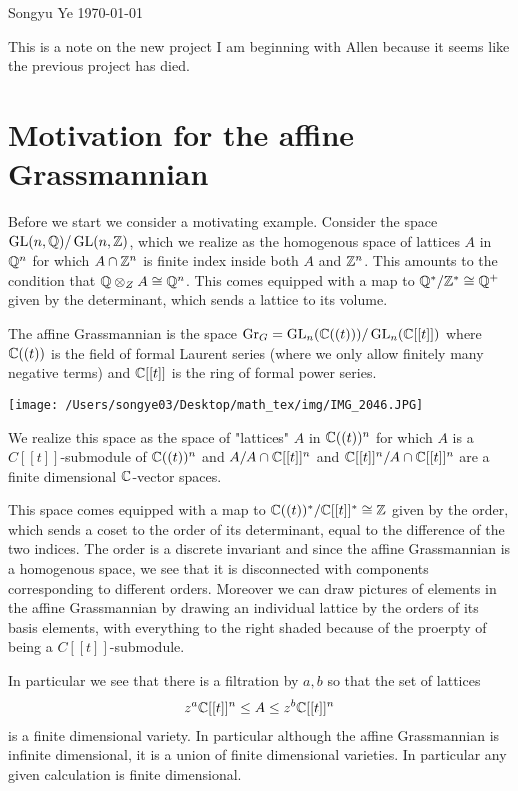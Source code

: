 \documentclass[12pt]{article}
\begin{document}
Songyu Ye
\today

\hfill

This is a note on the new project I am beginning with Allen because it seems like the previous project
has died.

\section{Motivation for the affine Grassmannian}
Before we start we consider a motivating example. Consider the space 
$\operatorname{GL}(n,\mathbb{Q})/\operatorname{GL}(n,\mathbb{Z})$, which we realize as the homogenous space of lattices $A$ in $\mathbb{Q}^n$ for which $A\cap \mathbb{Z}^n$
is finite index inside both $A$ and $\mathbb{Z}^n$. This amounts to the condition that $\mathbb{Q} \otimes_Z A \cong \mathbb{Q}^n$.
This comes equipped with a map to $\mathbb{Q}^*/\mathbb{Z}^* \cong \mathbb{Q}^+$ given by the determinant, which sends a lattice to
its volume.

\begin{definition}
    The affine Grassmannian is the space $\operatorname{Gr}_G = \operatorname{GL}_n(\mathbb{C}((t)))/\operatorname{GL}_n(\mathbb{C}[[t]])$ where
    $\mathbb{C}((t))$ is the field of formal Laurent series (where we only allow
    finitely many negative terms) and $\mathbb{C}[[t]]$ is the ring of formal power series.
\end{definition}

\begin{center}
    \texttt{[image: /Users/songye03/Desktop/math\_tex/img/IMG\_2046.JPG]}
\end{center}
We realize this space as the space of "lattices" $A$ in $\mathbb{C}((t))^n$ for which $A$ is a $C[[t]]$-submodule
of $\mathbb{C}((t))^n$ and $A/A\cap \mathbb{C}[[t]]^n$ and $\mathbb{C}[[t]]^n/A\cap \mathbb{C}[[t]]^n$ are a finite dimensional $\mathbb{C}$-vector spaces.

\hfill

This space comes equipped with a map to $\mathbb{C}((t))^*/\mathbb{C}[[t]]^* \cong \mathbb{Z}$ given by the order, which sends a coset
to the order of its determinant, equal to the difference of the two indices. The order is a discrete invariant
and since the affine Grassmannian is a homogenous space, we see that it is disconnected with components corresponding to 
different orders. Moreover we can draw pictures of elements in the affine Grassmannian 
by drawing an individual lattice by the orders of its basis elements, with everything to the right 
shaded because of the proerpty of being a $C[[t]]$-submodule.

\hfill

In particular we see that there is a filtration by $a,b$ so that the set of lattices \begin{align}
    z^a \mathbb{C}[[t]]^n \leq A \leq z^b \mathbb{C}[[t]]^n
\end{align} is a finite dimensional variety. In particular although the affine Grassmannian is 
infinite dimensional, it is a union of finite dimensional varieties. In particular any given 
calculation is finite dimensional.
\end{document}
